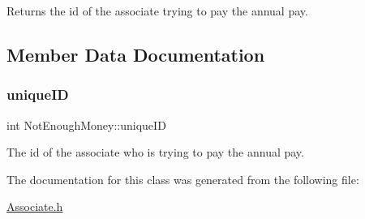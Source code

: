 Returns the id of the associate trying to pay the annual pay. 



\subsection{Member Data Documentation}
\mbox{\label{classNotEnoughMoney_a448ce0cf6fa4322dca36d379c3b94028}} 
\subsubsection{\texorpdfstring{unique\+ID}{uniqueID}}
{\footnotesize\ttfamily int Not\+Enough\+Money\+::unique\+ID\hspace{0.3cm}{\ttfamily [private]}}



The id of the associate who is trying to pay the annual pay. 



The documentation for this class was generated from the following file\+:\begin{DoxyCompactItemize}
\item 
\mbox{\hyperlink{Associate_8h}{Associate.\+h}}\end{DoxyCompactItemize}
